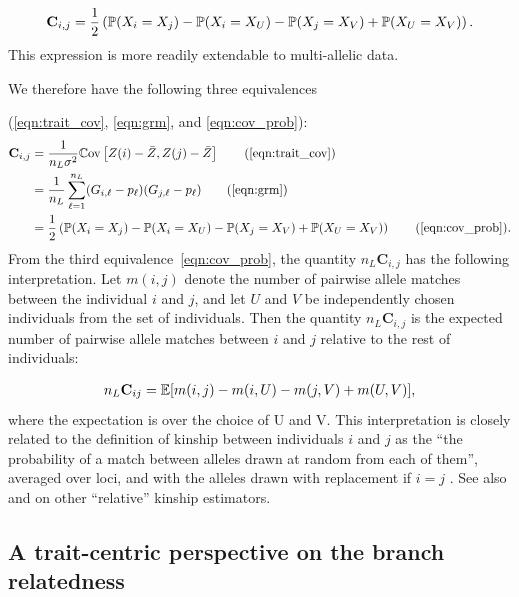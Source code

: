\begin{align} \label{eqn:cov_prob}
    \mathbf{C}_{i,j} = \frac{1}{2}\left(\P(X_i = X_j) - \P(X_i = X_U) - \P(X_j = X_V) + \P(X_U = X_V) \right).
\end{align}
This expression is more readily extendable to multi-allelic data.

We therefore have the following three equivalences

(\ref{eqn:trait_cov}, \ref{eqn:grm}, and \ref{eqn:cov_prob}):
%
\begin{align} \label{eqn:equivalence}
    \mathbf{C}_{i,j} &= \frac{1}{n_L \sigma^2}\Cov\left[Z(i) - \bar{Z}, Z(j) - \bar{Z}\right] \tag{\ref{eqn:trait_cov}} \\
                     &= \frac{1}{n_L}\sum_{\ell=1}^{n_L} (G_{i,\ell} - p_\ell)(G_{j,\ell} - p_\ell) \tag{\ref{eqn:grm}} \\
                     &= \frac{1}{2}\left(\P(X_i = X_j) - \P(X_i = X_U) - \P(X_j = X_V) + \P(X_U = X_V) \right) \tag{\ref{eqn:cov_prob}}.
\end{align}
%
From the third equivalence~\eqref{eqn:cov_prob},
the quantity $n_L\mathbf{C}_{i,j}$ has the following interpretation.
%
Let $m(i,j)$ denote the number of pairwise allele matches between
the individual $i$ and $j$,
and let $U$ and $V$ be independently chosen individuals from the set of individuals.
%
Then the quantity $n_L\mathbf{C}_{i,j}$
is the expected number of pairwise allele matches between $i$ and $j$
relative to the rest of individuals:

%
\begin{align} \label{eqn:relative_allele_matches}
    n_L \mathbf{C}_{ij} = \E[m(i,j) - m(i,U) - m(j,V) + m(U,V)],
\end{align}
%
where the expectation is over the choice of U and V.
%
This interpretation is closely related to the definition of kinship
between individuals $i$ and $j$ as the
``the probability of a match between alleles drawn at random from each of them'',
averaged over loci, and with the alleles drawn with replacement if $i=j$
\citep{malecot1948mathematiques, malecot1969mathemathics, speed2015relatedness}.
%
See also \citet{weir2017unified, weir2018how} and \citet{ochoa2021estimating} on
other ``relative'' kinship estimators.


\subsection{A trait-centric perspective on the branch relatedness} \label{sec:trait-centric}

